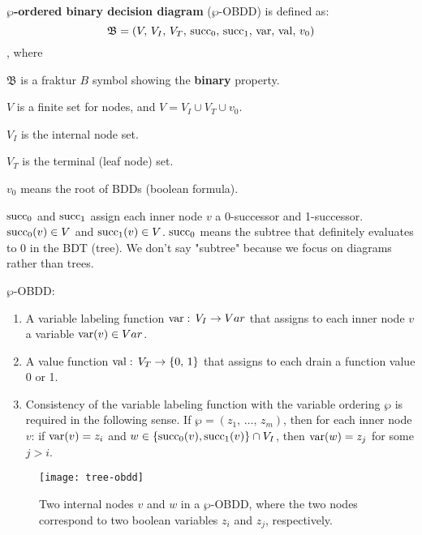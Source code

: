 \documentclass[../src/handouts/main.tex]{subfiles}
\begin{document}
\textbf{$\bm{\wp}$-ordered binary decision diagram} ($\wp$-OBDD) is defined as:
\[\mathfrak{B} = \left( V,\, V_I,\, V_T,\, \operatorname{succ}_0,\, \operatorname{succ}_1,\, \operatorname{var},\, \operatorname{val},\, v_0 \right)\]
, where
\begin{enumerate*}
  \item $\mathfrak{B}$ is a fraktur $B$ symbol showing the \textbf{binary} property.
  \item $V$ is a finite set for nodes, and $V = V_I \cup V_T \cup v_0$.
  \item $V_I$ is the internal node set.
  \item $V_T$ is the terminal (leaf node) set.
  \item $v_0$ means the root of BDDs (boolean formula).
  \item $\operatorname{succ}_0$ and $\operatorname{succ}_1$ assign each inner node $v$ a 0-successor and 1-successor. $\operatorname{succ}_0(v) \in V$ and $\operatorname{succ}_1(v) \in V$. $\operatorname{succ}_0$ means the subtree that definitely evaluates to 0 in the BDT (tree). We don't say "subtree" because we focus on diagrams rather than trees.
\end{enumerate*}

$\wp$-OBDD:
\begin{enumerate}
  \item A variable labeling function $\operatorname{var}:\, V_I \rightarrow Var$ that assigns to each inner node $v$ a variable $\operatorname{var}(v) \in Var$.
  \item A value function $\operatorname{val}:\, V_T \rightarrow \{0,\, 1\}$ that assigns to each drain a function value 0 or 1.
  \item Consistency of the variable labeling function with the variable ordering $\wp$ is required in the following sense. If $\wp = \left( z_1,\, \ldots,\, z_m \right)$, then for each inner node $v$: if $\operatorname{var}(v) = z_i$ and $w \in \left\{ \operatorname{succ}_0(v), \operatorname{succ}_1(v)\right\} \cap V_I$, then $\operatorname{var}(w) = z_j$ for some $j > i$.
\end{enumerate}

\begin{figure}[htbp]
  \centering
  \texttt{[image: tree-obdd]}
  \caption{Two internal nodes $v$ and $w$ in a $\wp$-OBDD, where the two nodes correspond to two boolean variables $z_i$ and $z_j$, respectively. }
  \label{fig:tree-obdd}
\end{figure}
\end{document}
